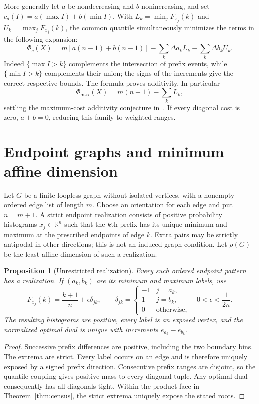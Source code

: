 \documentclass[11pt]{article}
\newtheorem{proposition}[theorem]{Proposition}
\theoremstyle{definition}\newtheorem{definition}[theorem]{Definition}
\newcommand{\R}{\mathbb R}
\newcommand{\1}{\mathbf 1}
\begin{document}
More generally let $a$ be nondecreasing and $b$ nonincreasing, and set
$c_d(I)=a(\max I)+b(\min I)$. With $L_k=\min_jF_{x_j}(k)$ and
$U_k=\max_jF_{x_j}(k)$, the common quantile simultaneously minimizes the terms
in the following expansion:
\[
 \Phi_c(X)=m[a(n-1)+b(n-1)]-\sum_k\Delta a_k L_k-\sum_k\Delta b_k U_k.
\]
Indeed $\{\max I>k\}$ complements the intersection of prefix events, while
$\{\min I>k\}$ complements their union; the signs of the increments give the
correct respective bounds. The formula proves additivity. In particular
\[
 \Phi_{\max}(X)=m(n-1)-\sum_k L_k,
\]
settling the maximum-cost additivity conjecture in~\cite[Section 5]{kline}.
If every diagonal cost is zero, $a+b=0$, reducing this family to weighted ranges.

\section{Endpoint graphs and minimum affine dimension}
Let $G$ be a finite loopless graph without isolated vertices, with a nonempty
ordered edge list of length $m$. Choose an orientation for each edge and put
$n=m+1$. A strict endpoint realization consists of positive probability
histograms $x_j\in\R^n$ such that the $k$th prefix has its unique minimum
and maximum at the prescribed endpoints of edge $k$. Extra pairs may be
strictly antipodal in other directions; this is not an induced-graph condition.
Let $\rho(G)$ be the least affine dimension of such a realization.

\begin{proposition}[Unrestricted realization]\label{prop:realize}
Every such ordered endpoint pattern has a realization. If $(a_k,b_k)$ are its
minimum and maximum labels, use
\[
 F_{x_j}(k)=\frac{k+1}{n}+\epsilon\delta_{jk},\qquad
 \delta_{jk}=\begin{cases}-1&j=a_k,\\1&j=b_k,\\0&\text{otherwise},\end{cases}
 \quad 0<\epsilon<\frac1{2n}.
\]
The resulting histograms are positive, every label is an exposed vertex, and
the normalized optimal dual is unique with increments $e_{a_k}-e_{b_k}$.
\end{proposition}
\begin{proof}
Successive prefix differences are positive, including the two boundary bins.
The extrema are strict. Every label occurs on an edge and is therefore uniquely
exposed by a signed prefix direction. Consecutive prefix ranges are disjoint,
so the quantile coupling gives positive mass to every diagonal tuple. Any
optimal dual consequently has all diagonals tight. Within the product face in
Theorem~\ref{thm:census}, the strict extrema uniquely expose the stated roots.
\end{proof}
\end{document}
